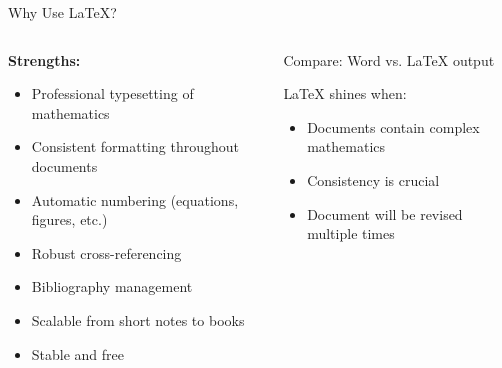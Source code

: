 \begin{frame}{Why Use LaTeX?}
    \begin{columns}
        \begin{column}{0.5\textwidth}
            \textbf{Strengths:}
            \begin{itemize}
                \item \alert{Professional typesetting} of mathematics
                \item Consistent formatting throughout documents
                \item Automatic numbering (equations, figures, etc.)
                \item Robust cross-referencing
                \item Bibliography management
                \item Scalable from short notes to books
                \item Stable and free
            \end{itemize}
        \end{column}
        
        \begin{column}{0.5\textwidth}
            \begin{center}
                Compare: Word vs. LaTeX output
            \end{center}
            
            \begin{alertblock}{LaTeX shines when:}
                \begin{itemize}
                    \item Documents contain complex mathematics
                    \item Consistency is crucial
                    \item Document will be revised multiple times
                \end{itemize}
            \end{alertblock}
        \end{column}
    \end{columns}
\end{frame}

